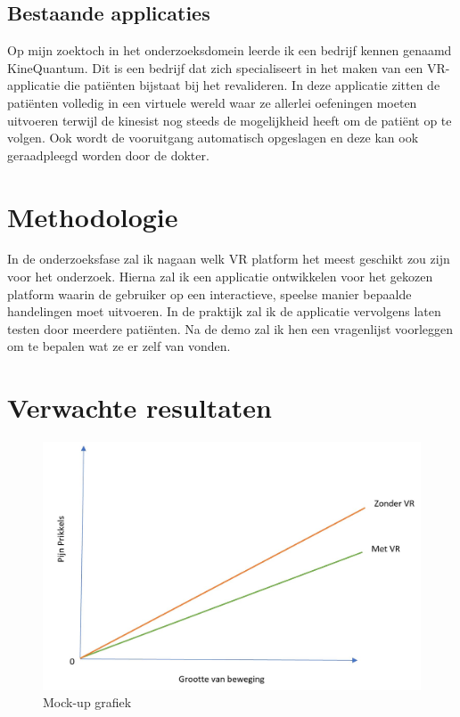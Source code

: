 \subsection{Bestaande applicaties}
Op mijn zoektoch in het onderzoeksdomein leerde ik een bedrijf kennen genaamd KineQuantum. Dit is een bedrijf dat zich specialiseert in het maken van een VR-applicatie die patiënten bijstaat bij het revalideren. In deze applicatie zitten de patiënten volledig in een virtuele wereld waar ze allerlei oefeningen moeten uitvoeren terwijl de kinesist nog steeds de mogelijkheid heeft om de patiënt op te volgen. Ook wordt de vooruitgang automatisch opgeslagen en deze kan ook geraadpleegd worden door de dokter.
\section{Methodologie}
\label{sec:methodologie}

In de onderzoeksfase zal ik nagaan welk VR platform het meest geschikt zou zijn voor het onderzoek. Hierna zal ik een applicatie ontwikkelen voor het gekozen platform waarin de gebruiker op een interactieve, speelse manier bepaalde handelingen moet uitvoeren. In de praktijk zal ik de applicatie vervolgens laten testen door meerdere patiënten. Na de demo zal ik hen een vragenlijst voorleggen om te bepalen wat ze er zelf van vonden.



\section{Verwachte resultaten}
\label{sec:verwachte_resultaten}

\begin{figure}[h]
    \centering
    \includegraphics[scale=0.5]{mockupGraph.JPG}
    \caption{Mock-up grafiek}
    \label{graph}
\end{figure}



